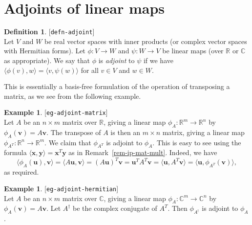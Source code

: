 \documentclass{amsart}
\newcommand{\lbl}[1]{\label{#1}\textup{[\texttt{#1}]}\ \\}
\newcommand{\lbl}{\label}
\newcommand{\R}         {{\mathbb{R}}}
\newcommand{\C}         {{\mathbb{C}}}
\newcommand{\tm}        {\times}
\newcommand{\ip}[1]     {\langle #1\rangle}
\newcommand{\vu}        {\mathbf{u}}
\newcommand{\vv}        {\mathbf{v}}
\newcommand{\vx}        {\mathbf{x}}
\newcommand{\vy}        {\mathbf{y}}
\renewcommand{\:}       {\colon}
\theoremstyle{definition}
\newtheorem{definition}[theorem]{Definition}
\newtheorem{example}[theorem]{Example}
\begin{document}
\section{Adjoints of linear maps}
\label{sec-adjoint}

\begin{definition}\lbl{defn-adjoint}
 Let $V$ and $W$ be real vector spaces with inner products
 (or complex vector spaces with Hermitian forms).  Let
 $\phi\:V\to W$ and $\psi\:W\to V$ be linear maps (over $\R$
 or $\C$ as appropriate).  We say that $\phi$ is
 \emph{adjoint} to $\psi$ if we have
 $\ip{\phi(v),w}=\ip{v,\psi(w)}$ for all $v\in V$ and
 $w\in W$.
\end{definition}

This is essentially a basis-free formulation of the
operation of transposing a matrix, as we see from the
following example.
\begin{example}\lbl{eg-adjoint-matrix}
 Let $A$ be an $n\tm m$ matrix over $\R$, giving a linear
 map $\phi_A\:\R^m\to\R^n$ by $\phi_A(\vv)=A\vv$.  The
 transpose of $A$ is then an $m\tm n$ matrix, giving a
 linear map $\phi_{A^T}\:\R^n\to\R^m$.  We claim that
 $\phi_{A^T}$ is adjoint to $\phi_A$.  This is easy to see
 using the formula $\ip{\vx,\vy}=\vx^T\vy$ as in
 Remark~\ref{rem-ip-mat-mult}.  Indeed, we have 
 \[ \ip{\phi_A(\vu),\vv} = \ip{A\vu,\vv} = 
     (A\vu)^T\vv = \vu^T A^T\vv = \ip{\vu,A^T\vv} =
      \ip{\vu,\phi_{A^T}(\vv)},
 \]
 as required.   
\end{example}
\begin{example}\lbl{eg-adjoint-hermitian}
 Let $A$ be an $n\tm m$ matrix over $\C$, giving a linear
 map $\phi_A\:\C^m\to\C^n$ by $\phi_A(\vv)=A\vv$.
 Let $A^\dag$ be the complex conjugate of $A^T$.  Then
 $\phi_{A^\dag}$ is adjoint to $\phi_A$.
\end{example}
\end{document}
